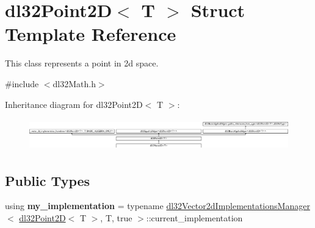 \hypertarget{structdl32_point2_d}{\section{dl32\-Point2\-D$<$ T $>$ Struct Template Reference}
\label{structdl32_point2_d}
}


This class represents a point in 2d space.  




{\ttfamily \#include $<$dl32\-Math.\-h$>$}

Inheritance diagram for dl32\-Point2\-D$<$ T $>$\-:\begin{figure}[H]
\begin{center}
\leavevmode
\includegraphics[height=1.387856cm]{structdl32_point2_d}
\end{center}
\end{figure}
\subsection*{Public Types}
\begin{DoxyCompactItemize}
\item 
\hypertarget{structdl32_point2_d_a7ac72dbdc55dbd6102f1ef6da30d3204}{using {\bfseries my\-\_\-implementation} = typename \hyperlink{classdl32_vector2d_implementations_manager}{dl32\-Vector2d\-Implementations\-Manager}$<$ \hyperlink{structdl32_point2_d}{dl32\-Point2\-D}$<$ T $>$, T, true $>$\-::current\-\_\-implementation}\label{structdl32_point2_d_a7ac72dbdc55dbd6102f1ef6da30d3204}

\end{DoxyCompactItemize}
